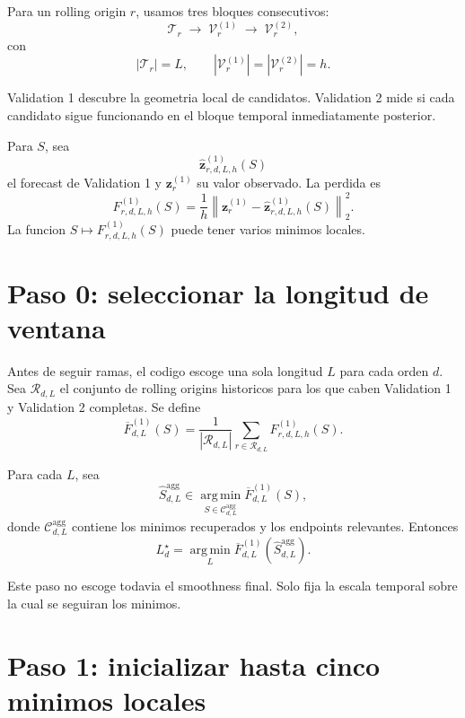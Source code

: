 \documentclass[11pt]{article}
\newcommand{\argmin}{\operatorname*{arg\,min}}
\begin{document}
Para un rolling origin \(r\), usamos tres bloques consecutivos:
\[
\boxed{\mathcal{T}_r}
\;\longrightarrow\;
\boxed{\mathcal{V}^{(1)}_r}
\;\longrightarrow\;
\boxed{\mathcal{V}^{(2)}_r},
\]
con
\[
|\mathcal{T}_r|=L,
\qquad
|\mathcal{V}^{(1)}_r|
=
|\mathcal{V}^{(2)}_r|
=
h.
\]

Validation 1 descubre la geometria local de candidatos. Validation 2 mide si
cada candidato sigue funcionando en el bloque temporal inmediatamente
posterior.

Para \(S\), sea
\[
\widehat{\bm z}^{(1)}_{r,d,L,h}(S)
\]
el forecast de Validation 1 y \(\bm z^{(1)}_r\) su valor observado. La perdida
es
\begin{equation}
F^{(1)}_{r,d,L,h}(S)
=
\frac{1}{h}
\left\|
\bm z^{(1)}_r
-
\widehat{\bm z}^{(1)}_{r,d,L,h}(S)
\right\|_2^2.
\label{eq:val1}
\end{equation}
La funcion \(S\mapsto F^{(1)}_{r,d,L,h}(S)\) puede tener varios minimos
locales.

\section{Paso 0: seleccionar la longitud de ventana}

Antes de seguir ramas, el codigo escoge una sola longitud \(L\) para cada
orden \(d\). Sea \(\mathcal{R}_{d,L}\) el conjunto de rolling origins historicos
para los que caben Validation 1 y Validation 2 completas. Se define
\begin{equation}
\overline F^{(1)}_{d,L}(S)
=
\frac{1}{|\mathcal{R}_{d,L}|}
\sum_{r\in\mathcal{R}_{d,L}}
F^{(1)}_{r,d,L,h}(S).
\label{eq:aggregate}
\end{equation}

Para cada \(L\), sea
\[
\widehat S_{d,L}^{\mathrm{agg}}
\in
\argmin_{S\in\mathcal{C}_{d,L}^{\mathrm{agg}}}
\overline F^{(1)}_{d,L}(S),
\]
donde \(\mathcal{C}_{d,L}^{\mathrm{agg}}\) contiene los minimos recuperados y
los endpoints relevantes. Entonces
\begin{equation}
L_d^\star
=
\argmin_L
\overline F^{(1)}_{d,L}
\left(
\widehat S_{d,L}^{\mathrm{agg}}
\right).
\label{eq:Lselection}
\end{equation}

Este paso no escoge todavia el smoothness final. Solo fija la escala temporal
sobre la cual se seguiran los minimos.

\section{Paso 1: inicializar hasta cinco minimos locales}
\end{document}
